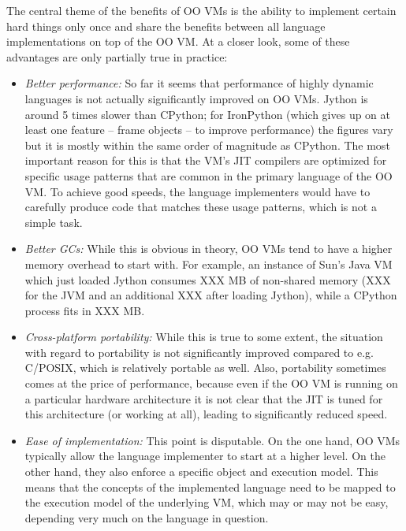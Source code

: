 \documentclass{llncs}
\begin{document}
\noindent
The central theme of the benefits of OO VMs is the ability to
implement certain hard things only once and share the benefits between
all language implementations on top of the OO VM.  At a closer look,
some of these advantages are only partially true in practice:

\begin{itemize}
\item
\emph{Better performance:} So far it seems that performance of highly dynamic
languages is not actually significantly improved on OO VMs. 
Jython is around 5
times slower than CPython; for IronPython (which
gives up on at least one feature -- frame objects -- to improve performance)
the figures vary but it is mostly
within the same order of magnitude as CPython. The most important reason for
this is that the VM's JIT compilers are optimized for specific usage patterns
that are common in the primary language of the OO VM. To achieve good speeds, the
language implementers would have to carefully produce code that matches these
usage patterns, which is not a simple task.

\item
\emph{Better GCs:} While this is obvious in theory, OO VMs tend to have a
higher memory overhead to start with.  For example, an instance of Sun's
Java VM which just loaded Jython consumes XXX MB of non-shared memory
(XXX for the JVM and an additional XXX after loading Jython), while a
CPython process fits in XXX MB.

\item
\emph{Cross-platform portability:} While this is true to some extent, the
situation with regard to portability is not significantly improved compared to
e.g.  C/POSIX, which is relatively portable as well. Also, portability sometimes
comes at the price of performance, because even if the OO VM is running on a
particular hardware architecture it is not clear that the JIT is tuned for this
architecture (or working at all), leading to significantly reduced
speed.

\item
\emph{Ease of implementation:} This point is disputable. On the one hand, OO
VMs typically allow the language implementer to start at a higher level. On the
other hand, they also enforce a specific object and execution model. This means
that the concepts of the implemented language need to be mapped to the
execution model of the underlying VM, which may or may not be easy, depending very
much on the language in question.


\end{itemize}
\end{document}
